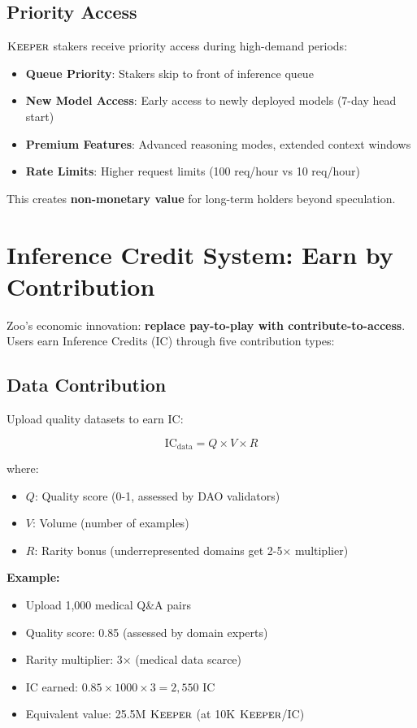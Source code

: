 \documentclass[11pt,letterpaper]{article}
\theoremstyle{definition}
\theoremstyle{remark}
\newcommand{\KEEPER}{\textsc{Keeper}}
\begin{document}
\subsection{Priority Access}

$\KEEPER$ stakers receive priority access during high-demand periods:

\begin{itemize}
\item \textbf{Queue Priority}: Stakers skip to front of inference queue
\item \textbf{New Model Access}: Early access to newly deployed models (7-day head start)
\item \textbf{Premium Features}: Advanced reasoning modes, extended context windows
\item \textbf{Rate Limits}: Higher request limits (100 req/hour vs 10 req/hour)
\end{itemize}

This creates \textbf{non-monetary value} for long-term holders beyond speculation.

\section{Inference Credit System: Earn by Contribution}

Zoo's economic innovation: \textbf{replace pay-to-play with contribute-to-access}. Users earn Inference Credits (IC) through five contribution types:

\subsection{Data Contribution}

Upload quality datasets to earn IC:

\begin{equation}
\text{IC}_{\text{data}} = Q \times V \times R
\end{equation}

where:
\begin{itemize}
\item $Q$: Quality score (0-1, assessed by DAO validators)
\item $V$: Volume (number of examples)
\item $R$: Rarity bonus (underrepresented domains get 2-5× multiplier)
\end{itemize}

\textbf{Example:}
\begin{itemize}
\item Upload 1,000 medical Q\&A pairs
\item Quality score: 0.85 (assessed by domain experts)
\item Rarity multiplier: 3× (medical data scarce)
\item IC earned: $0.85 \times 1000 \times 3 = 2,550$ IC
\item Equivalent value: 25.5M $\KEEPER$ (at 10K $\KEEPER$/IC)
\end{itemize}
\end{document}
